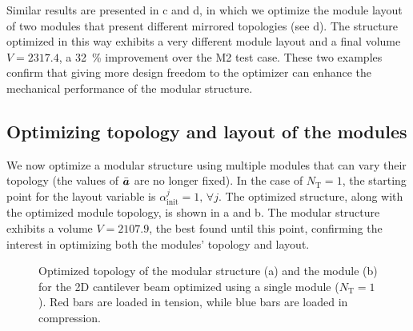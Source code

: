 Similar results are presented in c and d, in which we optimize the module layout of two modules that present different mirrored topologies (see d). The structure optimized in this way exhibits a very different module layout and a final volume $V = 2317.4$, a \qty{32}{\%} improvement over the M2 test case. These two examples confirm that giving more design freedom to the optimizer can enhance the mechanical performance of the modular structure.

\subsection{Optimizing topology and layout of the modules}
We now optimize a modular structure using multiple modules that can vary their topology (the values of $\bar{\bm{a}}$ are no longer fixed). In the case of $N_\text{T}=1$, the starting point for the layout variable is $\alpha^j_\text{init}=1, \, \forall j$. The optimized structure, along with the optimized module topology, is shown in a and b. The modular structure exhibits a volume $V = 2107.9$, the best found until this point, confirming the interest in optimizing both the modules' topology and layout.

\begin{figure}
    \hspace*{\fill}
    \hfill
    \hspace*{\fill}
    \caption{Optimized topology of the modular structure (a) and the module (b) for the 2D cantilever beam optimized using a single module ($N_\text{T}=1$). Red bars are loaded in tension, while blue bars are loaded in compression.}
    \label{fig:06_module_topol_opt}
\end{figure}

